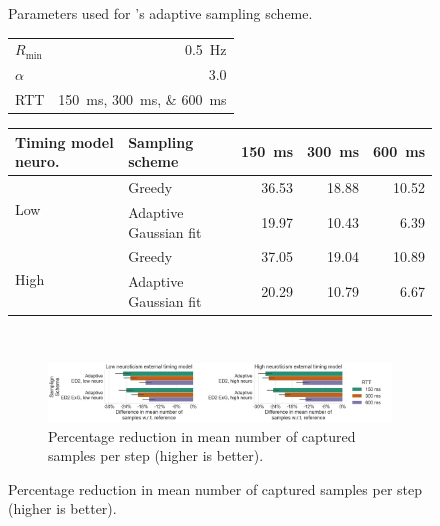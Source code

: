 \begin{figure}
    \centering
    \begin{subtable}[t]{.25\textwidth}
        \centering
        \caption{Parameters used for \textcite{Wang2019Towards}'s adaptive sampling scheme.}
        \medskip
        \begin{tabular}{lr}
            \toprule
            \( R_\text{min} \)  & \SI{0.5}{\hertz} \\
            \( \alpha \)        & \num{3.0} \\
            \ac{RTT}            & \SIlist{150;300;600}{\milli\second} \\
            \bottomrule
        \end{tabular}
    \end{subtable}%
    \hspace{.05\textwidth}%
    \begin{subtable}[t]{.65\textwidth}
        \centering
        \caption{Mean number of captured samples per sampling scheme at the three different \acp{RTT}.}
        \medskip
        \begin{tabular}{llrrr}
            \toprule 
            Timing model neuro. & Sampling scheme & \SI{150}{\milli\second} & \SI{300}{\milli\second} & \SI{600}{\milli\second} \\
           \midrule
           \multirow[c]{2}{*}{Low} & Greedy & \num{36.53} & \num{18.88} & \num{10.52} \\
            & Adaptive Gaussian fit & \num{19.97} & \num{10.43} & \num{6.39} \\
           \multirow[c]{2}{*}{High} & Greedy & \num{37.05} & \num{19.04} & \num{10.89} \\
            & Adaptive Gaussian fit & \num{20.29} & \num{10.79} & \num{6.67} \\
            \bottomrule
        \end{tabular}
    \end{subtable}\\
    \bigskip
    \begin{subfigure}[]{\textwidth}
        \centering
        \includegraphics[width=\textwidth]{figs/new_model/diff_sampling_junjue_both.png}
        \caption{%
            Percentage reduction in mean number of captured samples per step (higher is better).
}
\end{subfigure}
\end{figure}
